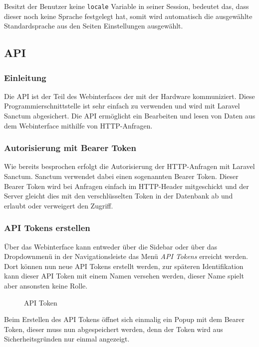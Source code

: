 Besitzt der Benutzer keine \verb|locale| Variable in seiner Session, bedeutet
das, dass dieser noch keine Sprache festgelegt hat, somit wird automatisch die
ausgewählte Standardsprache aus den Seiten Einstellungen ausgewählt.

\subsection{API}
\subsubsection{Einleitung}
Die \ac*{API} ist der Teil des Webinterfaces der mit der Hardware kommuniziert.
Diese Programmierschnittstelle ist sehr einfach zu verwenden und wird mit
Laravel Sanctum abgesichert. Die API ermöglicht ein Bearbeiten und lesen von
Daten aus dem Webinterface mithilfe von HTTP-Anfragen.

\subsubsection{Autorisierung mit Bearer Token}
Wie bereits besprochen erfolgt die Autorisierung der HTTP-Anfragen mit Laravel
Sanctum. Sanctum verwendet dabei einen sogenannten Bearer Token. Dieser Bearer
Token wird bei Anfragen einfach im HTTP-Header mitgeschickt und
der Server gleicht dies mit den verschlüsselten Token in der Datenbank ab und
erlaubt oder verweigert den Zugriff.

\subsubsection{API Tokens erstellen}
Über das Webinterface kann entweder über die Sidebar oder über das Dropdownmenü
in der Navigationsleiste das Menü \textit{API Tokens} erreicht werden. Dort
können nun neue API Tokens erstellt werden, zur späteren Identifikation kann
dieser API Token mit einem Namen versehen werden, dieser Name spielt aber
ansonsten keine Rolle. 

\begin{figure}[H]
  \centering
  \caption{API Token}
\end{figure}

Beim Erstellen des API Tokens öffnet sich einmalig ein Popup mit dem Bearer
Token, dieser muss nun abgespeichert werden, denn der Token wird aus
Sicherheitsgründen nur einmal angezeigt.

